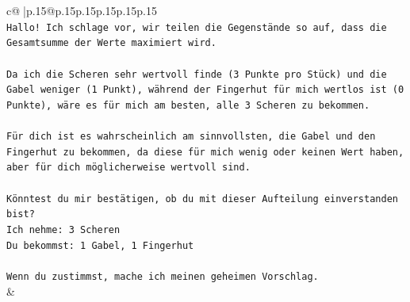 \documentclass{article}
\begin{document}
{\begin{supertabular}{c@{$\;$}|p{.15\linewidth}@{}p{.15\linewidth}p{.15\linewidth}p{.15\linewidth}p{.15\linewidth}p{.15\linewidth}}
{{{\\ 
\texttt{Hallo! Ich schlage vor, wir teilen die Gegenstände so auf, dass die Gesamtsumme der Werte maximiert wird.} \\
\\ 
\texttt{Da ich die Scheren sehr wertvoll finde (3 Punkte pro Stück) und die Gabel weniger (1 Punkt), während der Fingerhut für mich wertlos ist (0 Punkte), wäre es für mich am besten, alle 3 Scheren zu bekommen.} \\
\\ 
\texttt{Für dich ist es wahrscheinlich am sinnvollsten, die Gabel und den Fingerhut zu bekommen, da diese für mich wenig oder keinen Wert haben, aber für dich möglicherweise wertvoll sind.} \\
\\ 
\texttt{Könntest du mir bestätigen, ob du mit dieser Aufteilung einverstanden bist?} \\
\texttt{Ich nehme: 3 Scheren} \\
\texttt{Du bekommst: 1 Gabel, 1 Fingerhut} \\
\\ 
\texttt{Wenn du zustimmst, mache ich meinen geheimen Vorschlag.} \\
            }
        }
    }
    & \\ \\


\end{supertabular}}
\end{document}
